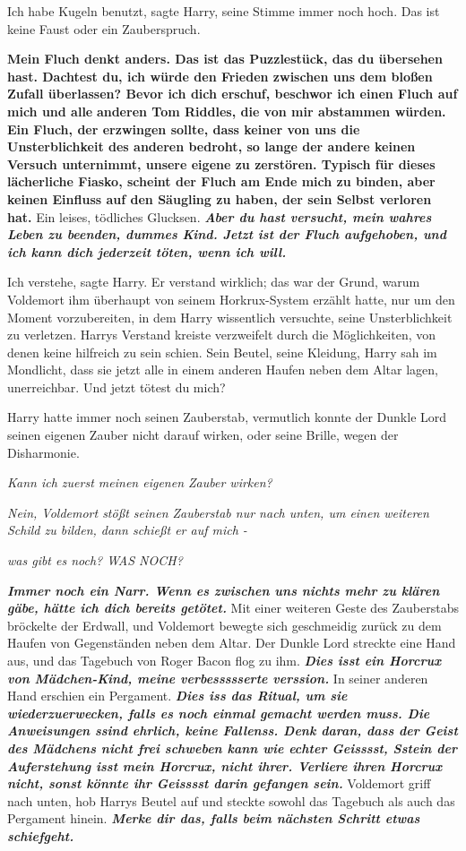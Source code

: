 \glqq{}Ich habe Kugeln benutzt\grqq{}, sagte Harry, seine Stimme immer noch hoch.
\glqq{}Das ist keine Faust oder ein Zauberspruch.\grqq{}

\glqq{}\textbf{Mein Fluch denkt anders. Das ist das Puzzlestück, das du übersehen
hast. Dachtest du, ich würde den Frieden zwischen uns dem bloßen Zufall
überlassen? Bevor ich dich erschuf, beschwor ich einen Fluch auf mich und alle
}\textbf{anderen Tom Riddles, die von mir abstammen würden. Ein Fluch, der
erzwingen sollte, dass keiner von uns die Unsterblichkeit des anderen bedroht,
so lange der andere keinen Versuch unternimmt, unsere eigene zu zerstören.
Typisch für dieses lächerliche Fiasko, scheint der Fluch am Ende mich zu binden,
aber keinen Einfluss auf den Säugling zu haben, der sein Selbst verloren
hat.}\grqq{} Ein leises, tödliches Glucksen. \glqq{}\textbf{\emph{Aber du hast
versucht, mein wahres Leben zu beenden, dummes Kind. Jetzt ist der Fluch
aufgehoben, und ich kann dich jederzeit töten, wenn ich will.}}\grqq{}

\glqq{}Ich verstehe\grqq{}, sagte Harry. Er verstand wirklich; das war der Grund,
warum Voldemort ihm überhaupt von seinem Horkrux-System erzählt hatte, nur um
den Moment vorzubereiten, in dem Harry wissentlich versuchte, seine
Unsterblichkeit zu verletzen. Harrys Verstand kreiste verzweifelt durch die
Möglichkeiten, von denen keine hilfreich zu sein schien. Sein Beutel, seine
Kleidung, Harry sah im Mondlicht, dass sie jetzt alle in einem anderen Haufen
neben dem Altar lagen, unerreichbar. \glqq{}Und jetzt tötest du mich?\grqq{}

Harry hatte immer noch seinen Zauberstab, vermutlich konnte der Dunkle Lord
seinen eigenen Zauber nicht darauf wirken, oder seine Brille, wegen der
Disharmonie.

\emph{Kann ich zuerst meinen eigenen Zauber wirken?}

\emph{Nein, Voldemort stößt seinen Zauberstab nur nach unten, um einen weiteren
Schild zu bilden, dann schießt er auf mich -}

\emph{was gibt es noch? WAS NOCH?}

\glqq{}\textbf{\emph{Immer noch ein Narr. Wenn es zwischen uns nichts mehr zu
klären gäbe, hätte ich dich bereits getötet.}}\grqq{} Mit einer weiteren Geste
des Zauberstabs bröckelte der Erdwall, und Voldemort bewegte sich geschmeidig
zurück zu dem Haufen von Gegenständen neben dem Altar. Der Dunkle Lord streckte
eine Hand aus, und das Tagebuch von Roger Bacon flog zu ihm. \glqq{}
\textbf{\emph{Dies isst ein Horcrux von Mädchen-Kind, meine verbessssserte
verssion.}}\grqq{} In seiner anderen Hand erschien ein Pergament. \glqq{}
\textbf{\emph{Dies iss das Ritual, um sie wiederzuerwecken, falls es noch einmal
gemacht werden muss. Die Anweisungen ssind ehrlich, keine Fallenss. Denk daran,
dass der Geist des Mädchens nicht frei schweben kann wie echter Geisssst, Sstein
der Auferstehung isst mein Horcrux, nicht ihrer. Verliere ihren Horcrux nicht,
sonst könnte ihr Geisssst darin gefangen sein.}}\grqq{} Voldemort griff nach unten,
hob Harrys Beutel auf und steckte sowohl das Tagebuch als auch das Pergament
hinein. \glqq{}\textbf{\emph{Merke dir das, falls beim nächsten Schritt etwas
schiefgeht.}}\grqq{}

